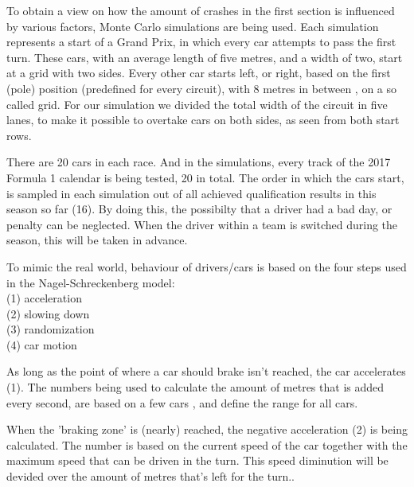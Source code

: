 To obtain a view on how the amount of crashes in the first section is influenced by various factors, Monte Carlo simulations are being used. Each simulation represents a start of a Grand Prix, in which every car attempts to pass the first turn. These cars, with an average length of five metres, and a width of two, start at a grid with two sides. Every other car starts left, or right, based on the first (pole) position (predefined for every circuit), with 8 metres in between \cite{car-regulations}, on a so called grid. For our simulation we divided the total width of the circuit in five lanes, to make it possible to overtake cars on both sides, as seen from both start rows.

There are 20 cars in each race. And in the simulations, every track of the 2017 Formula 1 calendar is being tested, 20 in total. The order in which the cars start, is sampled in each simulation out of all achieved qualification results in this season so far (16). By doing this, the possibilty that a driver had a bad day, or penalty can be neglected. When the driver within a team is switched during the season, this will be taken in advance.

To mimic the real world, behaviour of drivers/cars is based on the four steps used in the Nagel-Schreckenberg model:\\

\noindent
(1) acceleration\\
(2) slowing down\\
(3) randomization\\
(4) car motion

\smallskip
As long as the point of where a car should brake isn't reached, the car accelerates (1). The numbers being used to calculate the amount of metres that is added every second, are based on a few cars \cite{som}, and define the range for all cars.

When the 'braking zone' is (nearly) reached, the negative acceleration (2) is being calculated. The number is based on the current speed of the car together with the maximum speed that can be driven in the turn. This speed diminution will be devided over the amount of metres that's left for the turn.\cite{som}.

